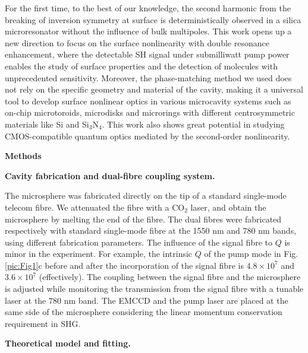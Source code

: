 \documentclass[a4paper,8pt,hyperref, twocolumn, aps, prl]{article}
\begin{document}
For the first time, to the best of our knowledge, the second harmonic from the breaking of inversion symmetry at surface is deterministically observed in a silica microresonator without the influence of bulk multipoles.
This work opens up a new direction to focus on the surface nonlinearity with double resonance enhancement, where the detectable SH signal under submilliwatt pump power enables the study of surface properties and the detection of molecules with unprecedented sensitivity.
Moreover, the phase-matching method we used does not rely on the specific geometry and material of the cavity, making it a universal tool to develop surface nonlinear optics in various microcavity systems such as on-chip microtoroids, microdisks and microrings with different centrosymmetric materials like Si and Si$_3$N$_4$.
This work also shows great potential in studying CMOS-compatible quantum optics mediated by the second-order nonlinearity.

\bigskip
\noindent \textbf{\large Methods}

\noindent \textbf{Cavity fabrication and dual-fibre coupling system.}

\noindent The microsphere was fabricated directly on the tip of a standard single-mode telecom fibre.
We attenuated the fibre with a CO$_2$ laser, and obtain the microsphere by melting the end of the fibre.
The dual fibres were fabricated respectively with standard single-mode fibre at the 1550 nm and 780 nm bands, using different fabrication parameters.
The influence of the signal fibre to $Q$ is minor in the experiment.
For example, the intrinsic $Q$ of the pump mode in Fig. \ref{pic:Fig1}c before and after the incorporation of the signal fibre is $4.8\times10^7$ and $3.6\times10^7$ (effectively).
The coupling between the signal fibre and the microsphere is adjusted while monitoring the transmission from the signal fibre with a tunable laser at the $780$ nm band.
The EMCCD and the pump laser are placed at the same side of the microsphere considering the linear momentum conservation requirement in SHG.

\noindent \textbf{Theoretical model and fitting.}
\end{document}
